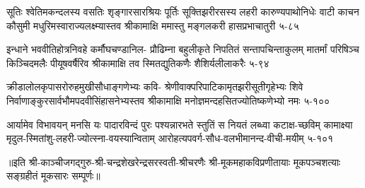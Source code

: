 \annofourlineindentedshloka
{सूतिः श्वेतिमकन्दलस्य वसतिः शृङ्गारसारश्रियः}
{पूर्तिः सूक्तिझरीरसस्य लहरी कारुण्यपाथोनिधेः}
{वाटी काचन कौसुमी मधुरिमस्वाराज्यलक्ष्म्यास्तव}
{श्रीकामाक्षि ममास्तु मङ्गलकरी हासप्रभाचातुरी}
{५-८५}

\annofourlineindentedshloka
{इन्धाने भववीतिहोत्रनिवहे कर्मौघचण्डानिल-}
{प्रौढिम्ना बहुलीकृते निपतितं सन्तापचिन्ताकुलम्}
{मातर्मां परिषिञ्च किञ्चिदमलैः पीयूषवर्षैरिव}
{श्रीकामाक्षि तव स्मितद्युतिकणैः शैशिर्यलीलाकरैः}
{५-९४}

\annofourlineindentedshloka
{क्रीडालोलकृपासरोरुहमुखीसौधाङ्गणेभ्यः कवि-}
{श्रेणीवाक्परिपाटिकामृतझरीसूतीगृहेभ्यः शिवे}
{निर्वाणाङ्कुरसार्वभौमपदवीसिंहासनेभ्यस्तव}
{श्रीकामाक्षि मनोज्ञमन्दहसितज्योतिष्कणेभ्यो नमः}
{५-१००}

\annofourlineindentedshloka
{आर्यामेव विभावयन् मनसि यः पादारविन्दं पुरः}
{पश्यन्नारभते स्तुतिं स नियतं लब्ध्वा कटाक्ष-च्छविम्}
{कामाक्ष्या मृदुल-स्मितांशु-लहरी-ज्योत्स्ना-वयस्यान्विताम्}
{आरोहत्यपवर्ग-सौध-वलभीमानन्द-वीची-मयीम्}
{५-१०१}

॥इति श्री-काञ्चीजगद्गुरु-श्री-चन्द्रशेखरेन्द्रसरस्वती-श्रीचरणैः श्री-मूकमहाकविप्रणीतायाः मूकपञ्चशत्याः सङ्ग्रहीतं मूकसारः सम्पूर्णः॥

\setlength{\shlokaspaceskip}{24pt}
\endgroup